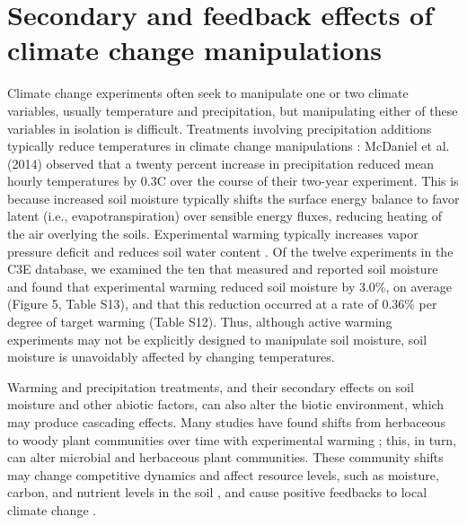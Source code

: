 \documentclass{article}
\begin{document}
\section* {Secondary and feedback effects of climate change manipulations} 
Climate change experiments often seek to manipulate one or two climate variables, usually temperature and precipitation, but manipulating either of these variables in isolation is difficult. Treatments involving precipitation additions typically reduce temperatures in climate change manipulations \citep{sherry2007,rollinson2012,mcdaniel2014}: McDaniel et al. (2014) observed that a twenty percent increase in precipitation reduced mean hourly temperatures by 0.3\degree C over the course of their two-year experiment. This is because increased soil moisture typically shifts the surface energy balance to favor latent (i.e., evapotranspiration) over sensible energy fluxes, reducing heating of the air overlying the soils. Experimental warming typically increases vapor pressure deficit and reduces soil water content \citep[e.g.,][]{sherry2007,morin2010,pelini2014,templer2016}. Of the twelve experiments in the C3E database, we examined the ten that measured and reported soil moisture and found that experimental warming reduced soil moisture by 3.0\%, on average (Figure 5, Table S13), and that this reduction occurred at a rate of 0.36\% per degree of target warming (Table S12). Thus, although active warming experiments may not be explicitly designed to manipulate soil moisture, soil moisture is unavoidably affected by changing temperatures. %

\par Warming and precipitation treatments, and their secondary effects on soil moisture and other abiotic factors, can also alter the biotic environment, which may produce cascading effects. Many studies have found shifts from herbaceous to woody plant communities over time with experimental warming \citep[e.g.,][]{rollinson2012, mcdaniel2014,mcdaniel2014b, harte2015}; this, in turn, can alter microbial and herbaceous plant communities. These community shifts may change competitive dynamics and affect resource levels, such as moisture, carbon, and nutrient levels in the soil \citep{mcdaniel2014,mcdaniel2014b, harte2015}, and cause positive feedbacks to local climate change \citep{harte2015}.%
\end{document}
